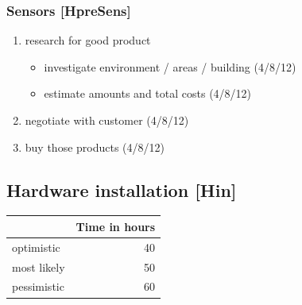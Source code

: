 \subsubsection{Sensors [HpreSens]}
\label{sec:org6352bec}

\begin{enumerate}
\item research for good product
\begin{itemize}
\item investigate environment / areas / building (4/8/12)
\item estimate amounts and total costs (4/8/12)
\end{itemize}
\item negotiate with customer (4/8/12)
\item buy those products (4/8/12)
\end{enumerate}



\subsection{Hardware installation [Hin]}
\label{sec:org2cae8f9}

\begin{center}
\begin{tabular}{|l|r|}
	\hline
	& Time in hours\\
	\hline
	optimistic & 40\\
	\hline
	most likely & 50\\
	\hline
	pessimistic & 60\\
	\hline
\end{tabular}
\end{center}

